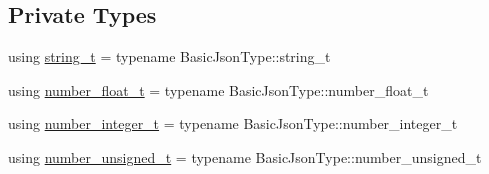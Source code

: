 \subsection*{Private Types}
\begin{DoxyCompactItemize}
\item 
using \mbox{\hyperlink{classnlohmann_1_1detail_1_1serializer_ad08aa54fac1dd0a453320c54137d45ba}{string\+\_\+t}} = typename Basic\+Json\+Type\+::string\+\_\+t
\item 
using \mbox{\hyperlink{classnlohmann_1_1detail_1_1serializer_a460c6794fbabbb2ae83380e987a6c030}{number\+\_\+float\+\_\+t}} = typename Basic\+Json\+Type\+::number\+\_\+float\+\_\+t
\item 
using \mbox{\hyperlink{classnlohmann_1_1detail_1_1serializer_ae7b1df1c70bdec1371f297567726a198}{number\+\_\+integer\+\_\+t}} = typename Basic\+Json\+Type\+::number\+\_\+integer\+\_\+t
\item 
using \mbox{\hyperlink{classnlohmann_1_1detail_1_1serializer_a16c7b7a726a38ff0c06dce7ba7968391}{number\+\_\+unsigned\+\_\+t}} = typename Basic\+Json\+Type\+::number\+\_\+unsigned\+\_\+t
\end{DoxyCompactItemize}
